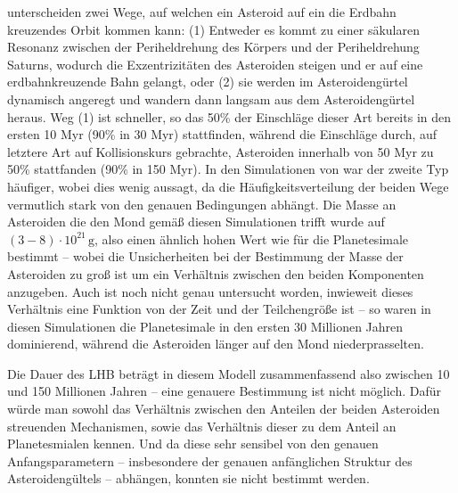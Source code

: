 \documentclass[12pt,a4paper,twoside]{article}
\begin{document}
\cite{Gomes2005} unterscheiden zwei Wege, auf welchen ein Asteroid auf ein die Erdbahn kreuzendes Orbit kommen kann: (1) Entweder es kommt zu einer säkularen Resonanz zwischen der Periheldrehung des Körpers und der Periheldrehung Saturns, wodurch die Exzentrizitäten des Asteroiden steigen und er auf eine erdbahnkreuzende Bahn gelangt, oder (2) sie werden im Asteroidengürtel dynamisch angeregt und wandern dann langsam aus dem Asteroidengürtel heraus. %
Weg (1) ist schneller, so das 50\% der Einschläge dieser Art bereits in den ersten 10 Myr (90\% in 30 Myr) stattfinden, während die Einschläge durch, auf letztere Art auf Kollisionskurs gebrachte, Asteroiden innerhalb von 50 Myr zu 50\% stattfanden (90\% in 150 Myr)\cite{Gomes2005}.
In den Simulationen von \cite{Gomes2005} war der zweite Typ häufiger, wobei dies wenig aussagt, da
die Häufigkeitsverteilung der beiden Wege vermutlich stark von den genauen Bedingungen abhängt. %
Die Masse an Asteroiden die den Mond gemäß diesen Simulationen trifft wurde auf $\left( 3-8 \right) \cdot 10^{21} \, \mathrm{g}$, %
also einen ähnlich hohen Wert wie für die Planetesimale bestimmt – wobei die Unsicherheiten bei der Bestimmung der Masse der Asteroiden zu groß ist um ein Verhältnis zwischen den beiden Komponenten anzugeben. Auch ist noch nicht genau untersucht worden, inwieweit dieses Verhältnis eine Funktion von der Zeit und der Teilchengröße ist – so waren in diesen Simulationen die Planetesimale in den ersten 30 Millionen Jahren dominierend, während die Asteroiden länger auf den Mond niederprasselten\cite{Gomes2005}.

Die Dauer des LHB beträgt in diesem Modell zusammenfassend also zwischen 10 und 150 Millionen Jahren – eine genauere Bestimmung ist nicht möglich. Dafür würde man sowohl das Verhältnis zwischen den Anteilen der beiden Asteroiden streuenden Mechanismen, sowie das Verhältnis dieser zu dem Anteil an Planetesmialen kennen. Und da diese sehr sensibel von den genauen Anfangsparametern – insbesondere der genauen anfänglichen Struktur des Asteroidengültels – abhängen, konnten sie nicht bestimmt werden\cite{Gomes2005}.
\end{document}
